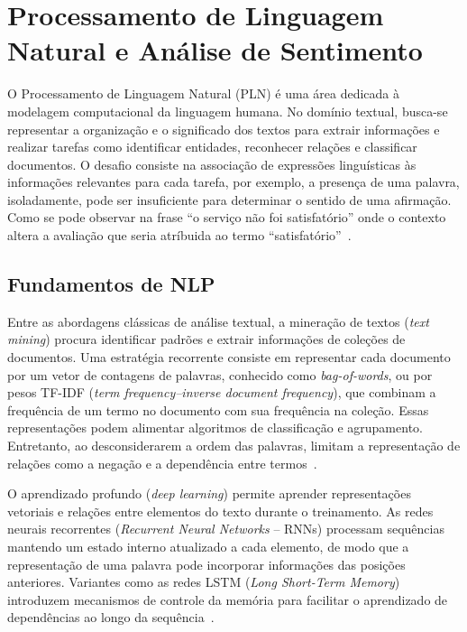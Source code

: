 \section{Processamento de Linguagem Natural e Análise de Sentimento}
\label{sec:nlp_sentimento}

O Processamento de Linguagem Natural (PLN) é uma área dedicada à modelagem computacional da linguagem humana. No domínio textual, busca-se representar a organização e o significado dos textos para extrair informações e realizar tarefas como identificar entidades, reconhecer relações e classificar documentos. O desafio consiste na associação de expressões linguísticas às informações relevantes para cada tarefa, por exemplo, a presença de uma palavra, isoladamente, pode ser insuficiente para determinar o sentido de uma afirmação. Como se pode observar na frase ``o serviço não foi satisfatório'' onde o contexto altera a avaliação que seria atríbuida ao termo ``satisfatório''~\cite{goldberg2016primer}.

\subsection{Fundamentos de NLP}
\label{subsec:fundamentos_nlp}

Entre as abordagens clássicas de análise textual, a mineração de textos (\textit{text mining}) procura identificar padrões e extrair informações de coleções de documentos. Uma estratégia recorrente consiste em representar cada documento por um vetor de contagens de palavras, conhecido como \textit{bag-of-words}, ou por pesos TF-IDF (\textit{term frequency--inverse document frequency}), que combinam a frequência de um termo no documento com sua frequência na coleção. Essas representações podem alimentar algoritmos de classificação e agrupamento. Entretanto, ao desconsiderarem a ordem das palavras, limitam a representação de relações como a negação e a dependência entre termos~\cite{manning2008ir}.

O aprendizado profundo (\textit{deep learning}) permite aprender representações vetoriais e relações entre elementos do texto durante o treinamento. As redes neurais recorrentes (\textit{Recurrent Neural Networks} -- RNNs) processam sequências mantendo um estado interno atualizado a cada elemento, de modo que a representação de uma palavra pode incorporar informações das posições anteriores. Variantes como as redes LSTM (\textit{Long Short-Term Memory}) introduzem mecanismos de controle da memória para facilitar o aprendizado de dependências ao longo da sequência~\cite{goldberg2016primer}.

